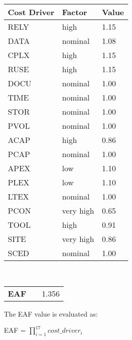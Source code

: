 \begin{center}
  \begin{tabular}{ l | l | l }%
   	\hline
	\textbf{Cost Driver} & \textbf{Factor} & \textbf{Value}
   	\\ \hline
    RELY & high & 1.15
    \\\hline
    DATA & nominal & 1.08
    \\\hline
    CPLX & high & 1.15
    \\\hline
    RUSE &  high & 1.15
 	  \\\hline
  	DOCU  & nominal & 1.00
   	\\\hline 
    TIME  & nominal & 1.00
   	\\\hline 
   	STOR  & nominal & 1.00
   	\\\hline 
   	PVOL  & nominal & 1.00
   	\\\hline 
   	ACAP  & high & 0.86
   	\\\hline 
   	PCAP  & nominal & 1.00
   	\\\hline 
   	APEX  & low & 1.10
   	\\\hline 
   	PLEX  & low & 1.10
   	\\\hline 
   	LTEX  & nominal & 1.00
   	\\\hline 
   	PCON  & very high & 0.65
   	\\\hline 
   	TOOL  & high & 0.91
   	\\\hline 
   	SITE  & very high & 0.86
   	\\\hline 
   	SCED  & nominal& 1.00
   	\\\hline 
  \end{tabular}
  \\\begin{tabular}{ l l | l }%
   	\\\textbf{EAF} & & 1.356
  \end{tabular}
\end{center}

The EAF value is evaluated as: 
\\\begin{center}EAF = $\prod_{i=1}^{17} cost\_driver_i$ \end{center}

